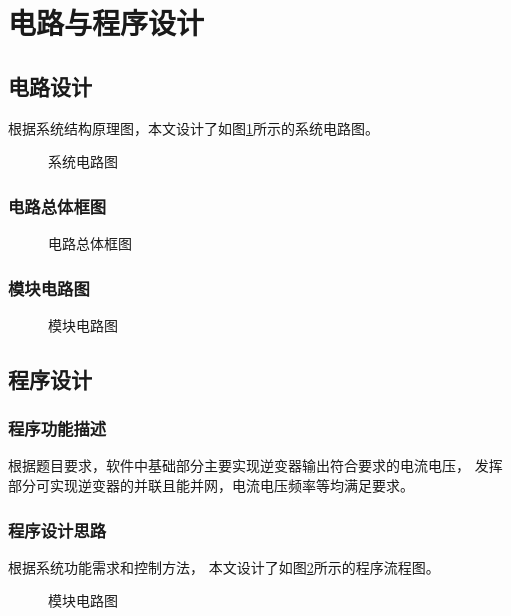 \documentclass[a4paper,12pt]{article}
\begin{document}
\newpage

\section{电路与程序设计}
\subsection{电路设计}
根据系统结构原理图，本文设计了如图\ref{fig5}所示的系统电路图。
\begin{figure}
\centering
\caption{系统电路图}
\label{fig5}
\end{figure}

\subsubsection{电路总体框图}
\begin{figure}
\centering
\caption{电路总体框图}
\end{figure}

\subsubsection{模块电路图}
\begin{figure}
\centering
\caption{模块电路图}
\end{figure}

\subsection{程序设计}

\subsubsection{程序功能描述}
根据题目要求，软件中基础部分主要实现逆变器输出符合要求的电流电压，
发挥部分可实现逆变器的并联且能并网，电流电压频率等均满足要求。

\subsubsection{程序设计思路}
根据系统功能需求和控制方法，
本文设计了如图\ref{fig8}所示的程序流程图。
\begin{figure}
\centering
\caption{模块电路图}
\label{fig8}
\end{figure}
\end{document}
